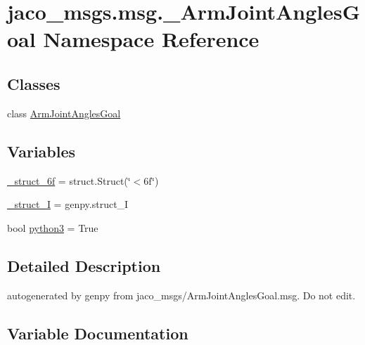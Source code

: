 \hypertarget{namespacejaco__msgs_1_1msg_1_1__ArmJointAnglesGoal}{}\section{jaco\+\_\+msgs.\+msg.\+\_\+\+Arm\+Joint\+Angles\+Goal Namespace Reference}
\label{namespacejaco__msgs_1_1msg_1_1__ArmJointAnglesGoal}
\subsection*{Classes}
\begin{DoxyCompactItemize}
\item 
class \hyperlink{classjaco__msgs_1_1msg_1_1__ArmJointAnglesGoal_1_1ArmJointAnglesGoal}{Arm\+Joint\+Angles\+Goal}
\end{DoxyCompactItemize}
\subsection*{Variables}
\begin{DoxyCompactItemize}
\item 
\hyperlink{namespacejaco__msgs_1_1msg_1_1__ArmJointAnglesGoal_a9f11880df4c70c65dbd55e7e0363d75c}{\+\_\+struct\+\_\+6f} = struct.\+Struct(\char`\"{}$<$6f\char`\"{})
\item 
\hyperlink{namespacejaco__msgs_1_1msg_1_1__ArmJointAnglesGoal_aa16363ec022a54b0264c3df8dce7c89b}{\+\_\+struct\+\_\+I} = genpy.\+struct\+\_\+I
\item 
bool \hyperlink{namespacejaco__msgs_1_1msg_1_1__ArmJointAnglesGoal_a3c1fa2cf2fcfecc3f172c11e92151baa}{python3} = True
\end{DoxyCompactItemize}


\subsection{Detailed Description}
\begin{DoxyVerb}autogenerated by genpy from jaco_msgs/ArmJointAnglesGoal.msg. Do not edit.\end{DoxyVerb}
 

\subsection{Variable Documentation}
